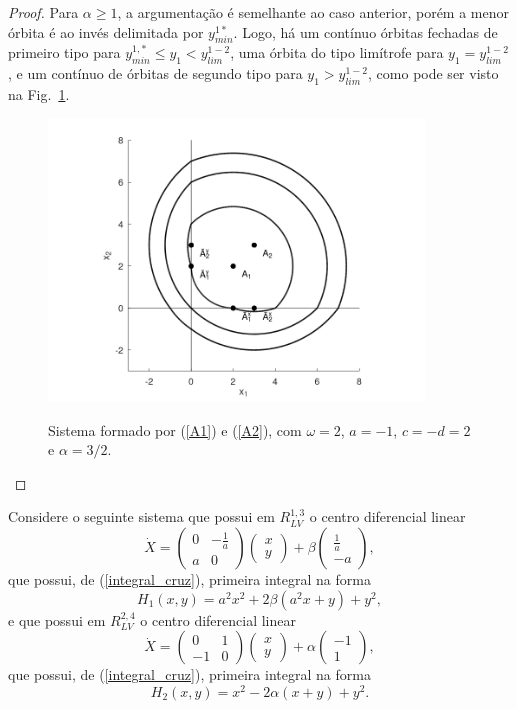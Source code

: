 \begin{proof}
Para $\alpha\geq1$, a argumentação é semelhante ao caso anterior, porém a menor órbita é ao invés delimitada por $y_{min}^{1*}$. Logo, há um contínuo órbitas fechadas de primeiro tipo para $y_{min}^{1,*}\leq y_1<y_{lim}^{1-2}$, uma órbita do tipo limítrofe  para $y_1=y_{lim}^{1-2}$, e um contínuo de órbitas de segundo tipo para $y_1>y_{lim}^{1-2}$,
como pode ser visto na Fig.~\ref{circ_aft_inv}.

\begin{figure}[H]
\centering
\includegraphics[width=10cm]{images/circ_aft_inv.png}\\
\caption{\label{circ_aft_inv}Sistema formado por (\ref{A1}) e (\ref{A2}), com $\omega=2$, $a=-1$, $c=-d=2$ e $\alpha=3/2$.}
\end{figure}
\end{proof}

Considere o seguinte sistema que possui em $R^{1,3}_{LV}$ o centro diferencial linear
\begin{equation}
\label{A1def}
\dot{X}=\left(\begin{array}{cc}
0 & -\frac{1}{a} \\
a & 0
\end{array}\right)\left(\begin{array}{l}
x \\
y
\end{array}\right)+\beta\left(\begin{array}{l}
\frac{1}{a} \\
-a
\end{array}\right),
\end{equation}
que possui, de (\ref{integral_cruz}), primeira integral na forma
$$H_1(x, y) = a^2 x^2 +2\beta(a^2x+y) +y^2,
$$
e que possui em $R^{2,4}_{LV}$ o centro diferencial linear 
\begin{equation}
\label{A2norm}
\dot{X}=\left(\begin{array}{cc}
0 & 1 \\
-1 & 0
\end{array}\right)\left(\begin{array}{l}
x \\
y
\end{array}\right)+\alpha\left(\begin{array}{l}
-1 \\
1
\end{array}\right),
\end{equation}
que possui, de (\ref{integral_cruz}), primeira integral na forma
$$H_2(x, y) = x^2 -2\alpha(x+y) +y^2.
$$


